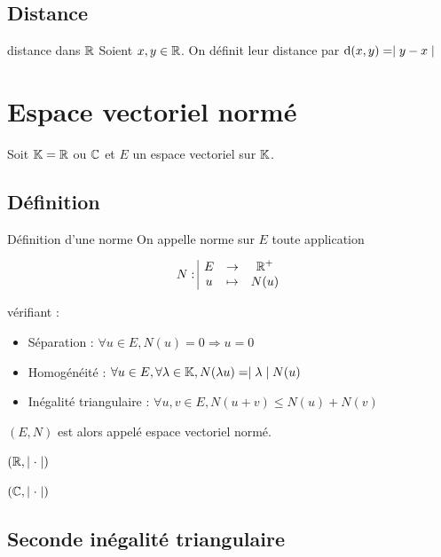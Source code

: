 \subsection{Distance }

\begin{definition}{distance dans $\mathbb{R}$}{}
    Soient $x, y \in \mathbb{R}$. On définit leur distance par $\text d (x, y) = \mid y - x \mid$
\end{definition}

\section{Espace vectoriel normé}

Soit $\mathbb K = \mathbb{R}$ ou $\mathbb{C}$ et $E$ un espace vectoriel sur $\mathbb{K}$.

\subsection{Définition}

\begin{definition}{Définition d'une norme}{}
    On appelle norme sur $E$ toute application 

    \lvspace \avspace $$N: \space \begin{array}{|ccc} \displaystyle E & \to & \displaystyle \mathbb{R}^+ \\ \displaystyle u & \mapsto & \displaystyle N(u) \end{array}$$

    vérifiant : 
    \begin{itemize}
        \item Séparation : $\forall u \in E, N(u) = 0 \Rightarrow u = 0$
        \item Homogénéité : $\forall u \in E, \forall \lambda \in \mathbb{K}, N(\lambda u) = \mid \lambda \mid N(u)$
        \item Inégalité triangulaire : $\forall u, v \in E, N(u + v) \leqslant N(u) + N(v)$
    \end{itemize}

    $(E, N)$ est alors appelé espace vectoriel normé.
\end{definition}

\begin{exemple}
    $(\mathbb{R}, \mid \cdot \mid)$

    $(\mathbb{C}, \mid \cdot \mid)$
\end{exemple}


\subsection{Seconde inégalité triangulaire }

